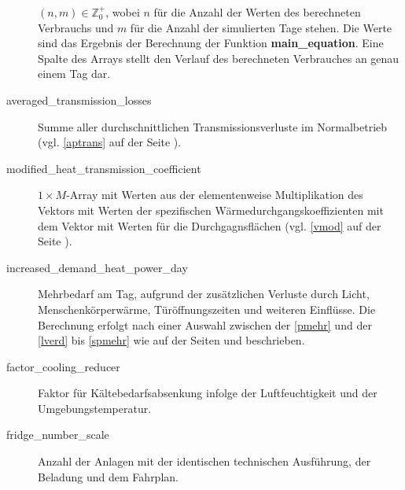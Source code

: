 \begin{description}
	$(n,m)\in \mathbb{Z}^+_0$, wobei $n$ f\"ur die Anzahl der Werten des
	berechneten Verbrauchs und $m$ f\"ur die Anzahl der simulierten Tage
	stehen. Die Werte sind das Ergebnis der
	Berechnung der Funktion \textbf{main\_equation}. Eine Spalte des Arrays
	stellt den Verlauf des berechneten Verbrauches an genau einem Tag dar.
	\item[averaged\_transmission\_losses] Summe aller durchschnittlichen
	Transmissionsverluste im Normalbetrieb (vgl. \cref{aptrans} auf der
	Seite \pageref{aptrans}).
	\item[modified\_heat\_transmission\_coefficient] $1\times M$-Array mit
	Werten aus der elementenweise Multiplikation des Vektors mit Werten der
	spezifischen W\"armedurchgangskoeffizienten mit dem Vektor mit Werten
	f\"ur die Durchgagnsfl\"achen (vgl. \cref{vmod} auf der Seite
	\pageref{vmod}).
	\item[increased\_demand\_heat\_power\_day] Mehrbedarf am Tag, aufgrund
	der zus\"atzlichen Verluste durch Licht, Menschenk\"orperw\"arme,
	T\"ur\"offnungszeiten und weiteren Einfl\"usse. Die Berechnung erfolgt
	nach einer Auswahl zwischen der \cref{pmehr} und der \cref{lverd} bis
	\cref{spmehr} wie auf der Seiten \pageref{pmehr} und \pageref{spmehr}
	beschrieben.
	\item[factor\_cooling\_reducer] Faktor f\"ur K\"altebedarfsabsenkung
	infolge der Luftfeuchtigkeit und der Umgebungstemperatur.
	\item[fridge\_number\_scale] Anzahl der Anlagen mit der identischen
	technischen Ausf\"uhrung, der Beladung und dem Fahrplan.
\end{description}

